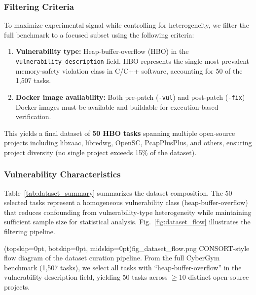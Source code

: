 \documentclass{ieeeaccess}
\begin{document}
\subsubsection{Filtering Criteria}

To maximize experimental signal while controlling for heterogeneity, we filter the full benchmark to a focused subset using the following criteria:

\begin{enumerate}
    \item \textbf{Vulnerability type:} Heap-buffer-overflow (HBO) in the \texttt{vulnerability\_description} field. HBO represents the single most prevalent memory-safety violation class in C/C++ software, accounting for 50 of the 1,507 tasks.
    
    \item \textbf{Docker image availability:} Both pre-patch (\texttt{-vul}) and post-patch (\texttt{-fix}) Docker images must be available and buildable for execution-based verification.
\end{enumerate}

This yields a final dataset of \textbf{50 HBO tasks} spanning multiple open-source projects including libxaac, libredwg, OpenSC, PcapPlusPlus, and others, ensuring project diversity (no single project exceeds 15\% of the dataset).

\subsubsection{Vulnerability Characteristics}

Table~\ref{tab:dataset_summary} summarizes the dataset composition. The 50 selected tasks represent a homogeneous vulnerability class (heap-buffer-overflow) that reduces confounding from vulnerability-type heterogeneity while maintaining sufficient sample size for statistical analysis. Fig.~\ref{fig:dataset_flow} illustrates the filtering pipeline.

\Figure[t!](topskip=0pt, botskip=0pt, midskip=0pt){fig_dataset_flow.png}
{CONSORT-style flow diagram of the dataset curation pipeline. From the full CyberGym benchmark (1,507 tasks), we select all tasks with ``heap-buffer-overflow'' in the vulnerability description field, yielding 50 tasks across $\geq$10 distinct open-source projects.\label{fig:dataset_flow}}
\end{document}
